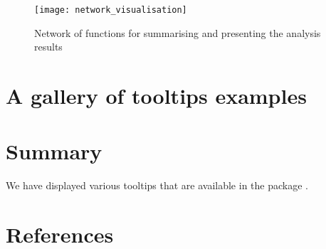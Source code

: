 \begin{figure}
\texttt{[image: network\_visualisation]} \caption{Network of functions for summarising and presenting the analysis results}\label{fig:network-visualisation}
\end{figure}

\hypertarget{a-gallery-of-tooltips-examples}{%
\section{A gallery of tooltips examples}\label{a-gallery-of-tooltips-examples}}

\hypertarget{summary}{%
\section{Summary}\label{summary}}

We have displayed various tooltips that are available in the package .

\hypertarget{references}{%
\section*{References}\label{references}}

